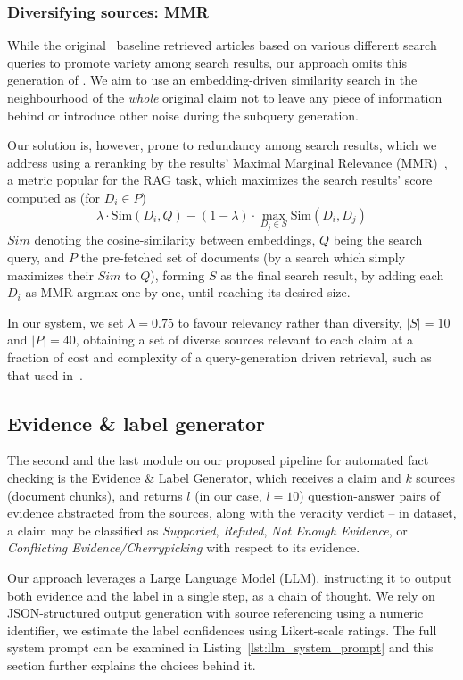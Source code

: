 \subsubsection{Diversifying sources: MMR}
While the original~\cite{averitec2024} baseline retrieved articles based on various different search queries to promote variety among search results, our approach omits this generation of .
We aim to use an embedding-driven similarity search in the neighbourhood of the \textit{whole} original claim not to leave any piece of information behind or introduce other noise during the subquery generation.

Our solution is, however, prone to redundancy among search results, which we address using a reranking by the results' Maximal Marginal Relevance (MMR)~\cite{carbonell-mmr}, a metric popular for the RAG task, which maximizes the search results' score computed as (for $D_i\in P$)
$$\lambda \cdot \mathrm{Sim}(D_i, Q) - (1-\lambda) \cdot \max_{D_j \in S} \mathrm{Sim}(D_i, D_j)$$
$Sim$ denoting the cosine-similarity between embeddings, $Q$ being the search query, and $P$ the pre-fetched set of documents (by a search which simply maximizes their $Sim$ to $Q$), forming $S$ as the final search result, by adding each $D_i$ as MMR-argmax one by one, until reaching its desired size.

In our system, we set $\lambda=0.75$ to favour relevancy rather than diversity, $|S|=10$ and $|P| = 40$, obtaining a set of diverse sources relevant to each claim at a fraction of cost and complexity of a query-generation driven retrieval, such as that used in~\cite{averitec2024}.

\subsection{Evidence \& label generator}
\label{sec:generation}
The second and the last module on our proposed pipeline for automated fact checking is the Evidence \& Label Generator, which receives a claim and $k$ sources (document chunks), and returns $l$ (in our case, $l=10$) question-answer pairs of evidence abstracted from the sources, along with the veracity verdict -- in \averitec{} dataset, a claim may be classified as \textit{Supported}, \textit{Refuted}, \textit{Not Enough Evidence}, or \textit{Conflicting Evidence/Cherrypicking} with respect to its evidence.

Our approach leverages a Large Language Model (LLM), instructing it to output both evidence and the label in a single step, as a chain of thought.
We rely on JSON-structured output generation with source referencing using a numeric identifier, we estimate the label confidences using Likert-scale ratings.
The full system prompt can be examined in Listing~\ref{lst:llm_system_prompt} and this section further explains the choices behind it.

